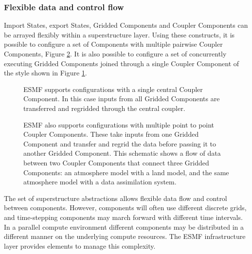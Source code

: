 \subsubsection{Flexible data and control flow}
Import States, export States, Gridded Components and Coupler Components can 
be arrayed flexibly within a superstructure layer. Using these constructs, it 
is possible to configure a set of Components with multiple
pairwise Coupler Components, Figure \ref{fig:point2point}.  It is also
possible to configure a set of concurrently
executing Gridded Components joined through a single Coupler Component of the 
style shown in Figure \ref{fig:hubspoke}. 

\begin{figure}
\caption{ESMF supports configurations with a single central Coupler Component. 
In this case inputs from all Gridded 
Components are transferred and regridded through the central coupler.}
\label{fig:hubspoke}
\end{figure}

\begin{figure}
\caption{ESMF also supports configurations with multiple point to point Coupler 
Components. These take inputs from one Gridded Component and transfer and regrid 
the data before passing it to another Gridded Component. This schematic shows a 
flow of data between two Coupler Components that connect three Gridded Components:  
an atmosphere model with a land model, and the same atmosphere model with a data 
assimilation system.}
\label{fig:point2point}
\end{figure}

The set of superstructure abstractions allows flexible data flow and control 
between components. However, components will often use different discrete grids, 
and time-stepping components may march forward with different time intervals. 
In a parallel compute environment different components may be distributed in a 
different manner on the underlying compute resources. The ESMF infrastructure 
layer provides elements to manage this complexity.


